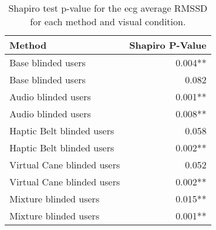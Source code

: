 
\begin{table}[!htb]
\centering
\caption{Shapiro test p-value for the ecg average RMSSD for each method and visual condition.}
\label{tab:shapiro_ecg_rmssd}
\begin{tabular}{lr}
\toprule
                    Method & Shapiro P-Value \\
\midrule
        Base blinded users &         0.004** \\
        Base blinded users &           0.082 \\
       Audio blinded users &         0.001** \\
       Audio blinded users &         0.008** \\
 Haptic Belt blinded users &           0.058 \\
 Haptic Belt blinded users &         0.002** \\
Virtual Cane blinded users &           0.052 \\
Virtual Cane blinded users &         0.002** \\
     Mixture blinded users &         0.015** \\
     Mixture blinded users &         0.001** \\
\bottomrule
\end{tabular}
\end{table}

